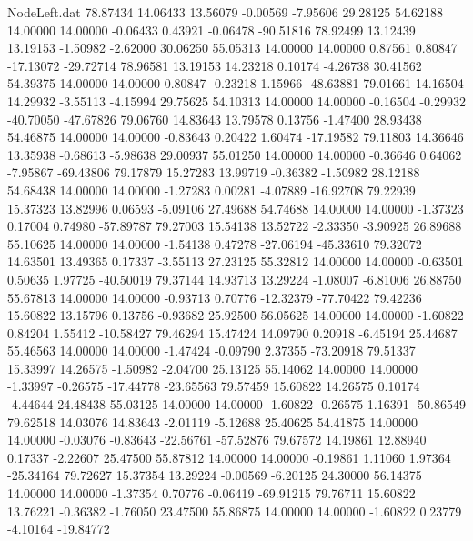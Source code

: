 \begin{filecontents}{NodeLeft.dat}
  78.87434   14.06433   13.56079    -0.00569   -7.95606   29.28125   54.62188   14.00000   14.00000   -0.06433    0.43921   -0.06478  -90.51816
  78.92499   13.12439   13.19153    -1.50982   -2.62000   30.06250   55.05313   14.00000   14.00000    0.87561    0.80847  -17.13072  -29.72714
  78.96581   13.19153   14.23218     0.10174   -4.26738   30.41562   54.39375   14.00000   14.00000    0.80847   -0.23218    1.15966  -48.63881
  79.01661   14.16504   14.29932    -3.55113   -4.15994   29.75625   54.10313   14.00000   14.00000   -0.16504   -0.29932  -40.70050  -47.67826
  79.06760   14.83643   13.79578     0.13756   -1.47400   28.93438   54.46875   14.00000   14.00000   -0.83643    0.20422    1.60474  -17.19582
  79.11803   14.36646   13.35938    -0.68613   -5.98638   29.00937   55.01250   14.00000   14.00000   -0.36646    0.64062   -7.95867  -69.43806
  79.17879   15.27283   13.99719    -0.36382   -1.50982   28.12188   54.68438   14.00000   14.00000   -1.27283    0.00281   -4.07889  -16.92708
  79.22939   15.37323   13.82996     0.06593   -5.09106   27.49688   54.74688   14.00000   14.00000   -1.37323    0.17004    0.74980  -57.89787
  79.27003   15.54138   13.52722    -2.33350   -3.90925   26.89688   55.10625   14.00000   14.00000   -1.54138    0.47278  -27.06194  -45.33610
  79.32072   14.63501   13.49365     0.17337   -3.55113   27.23125   55.32812   14.00000   14.00000   -0.63501    0.50635    1.97725  -40.50019
  79.37144   14.93713   13.29224    -1.08007   -6.81006   26.88750   55.67813   14.00000   14.00000   -0.93713    0.70776  -12.32379  -77.70422
  79.42236   15.60822   13.15796     0.13756   -0.93682   25.92500   56.05625   14.00000   14.00000   -1.60822    0.84204    1.55412  -10.58427
  79.46294   15.47424   14.09790     0.20918   -6.45194   25.44687   55.46563   14.00000   14.00000   -1.47424   -0.09790    2.37355  -73.20918
  79.51337   15.33997   14.26575    -1.50982   -2.04700   25.13125   55.14062   14.00000   14.00000   -1.33997   -0.26575  -17.44778  -23.65563
  79.57459   15.60822   14.26575     0.10174   -4.44644   24.48438   55.03125   14.00000   14.00000   -1.60822   -0.26575    1.16391  -50.86549
  79.62518   14.03076   14.83643    -2.01119   -5.12688   25.40625   54.41875   14.00000   14.00000   -0.03076   -0.83643  -22.56761  -57.52876
  79.67572   14.19861   12.88940     0.17337   -2.22607   25.47500   55.87812   14.00000   14.00000   -0.19861    1.11060    1.97364  -25.34164
  79.72627   15.37354   13.29224    -0.00569   -6.20125   24.30000   56.14375   14.00000   14.00000   -1.37354    0.70776   -0.06419  -69.91215
  79.76711   15.60822   13.76221    -0.36382   -1.76050   23.47500   55.86875   14.00000   14.00000   -1.60822    0.23779   -4.10164  -19.84772

\end{filecontents}

